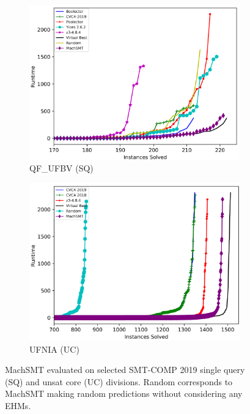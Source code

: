 \documentclass{article}
\begin{document}
\begin{figure}
\begin{subfigure}{0.48\textwidth}
    \includegraphics[width=\textwidth]{plot/machsmt_qf_ufbv.png}
    \caption{QF\_UFBV (SQ)}
    \label{fig:machsmt_qfufbv}
  \end{subfigure}
  \hspace{0.75em}
  \begin{subfigure}{0.48\textwidth}
    \includegraphics[width=\textwidth]{plot/machsmt_ufnia.png}
    \caption{UFNIA (UC)}
    \label{fig:machsmt_ufnia}
  \end{subfigure}

  \caption{MachSMT evaluated on selected SMT-COMP 2019 single query (SQ) and
           unsat core (UC) divisions. Random corresponds to MachSMT making
           random predictions without considering any EHMs.}
  \label{fig:machsmt_results}
\end{figure}



{}

\end{document}
